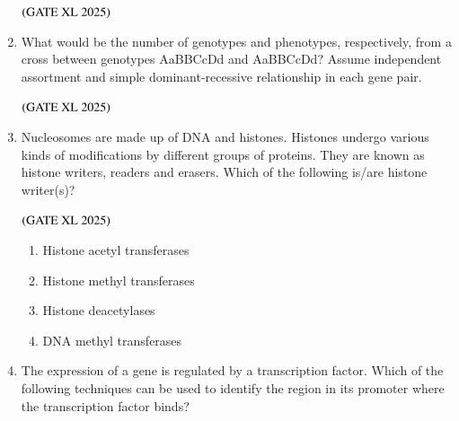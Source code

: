 \documentclass[journal]{IEEEtran}
\begin{document}
\begin{enumerate}
    \hfill $\left(\text{GATE XL 2025}\right)$
    \begin{enumerate}
    \end{enumerate}

    \item What would be the number of genotypes and phenotypes, respectively, from a cross between genotypes AaBBCcDd and AaBBCcDd? Assume independent assortment and simple dominant-recessive relationship in each gene pair.

    \hfill $\left(\text{GATE XL 2025}\right)$
    \begin{enumerate}
    \end{enumerate}

    \item Nucleosomes are made up of DNA and histones. Histones undergo various kinds of modifications by different groups of proteins. They are known as histone writers, readers and erasers. Which of the following is/are histone writer(s)?

    \hfill $\left(\text{GATE XL 2025}\right)$
    \begin{enumerate}
        \item Histone acetyl transferases
        \item Histone methyl transferases
        \item Histone deacetylases
        \item DNA methyl transferases
    \end{enumerate}

    \item The expression of a gene is regulated by a transcription factor. Which of the following techniques can be used to identify the region in its promoter where the transcription factor binds?


\end{enumerate}
\end{document}
